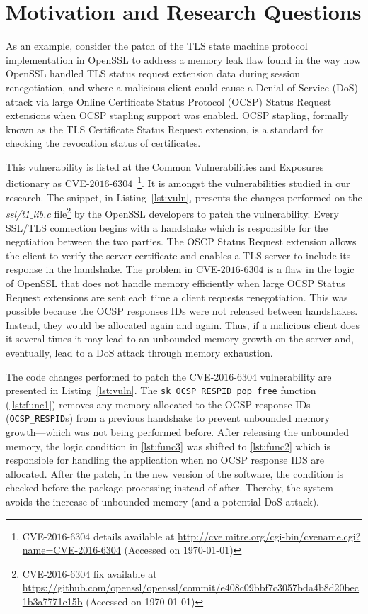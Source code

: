 \documentclass[smallextended]{svjour3}       %
\makeatletter
\newcommand\footnoteref[1]{\protected@xdef\@thefnmark{\ref{#1}}\@footnotemark}
\makeatother
\begin{document}
\section{Motivation and Research Questions}\label{sec:motivation}

As an example, consider the patch of the TLS state machine protocol 
implementation in OpenSSL\footnoteref{openssl} to address a memory 
leak flaw found in the way how OpenSSL handled TLS status request 
extension data during session renegotiation, and where a malicious 
client could cause a Denial-of-Service (DoS) attack via large Online 
Certificate Status Protocol (OCSP) Status Request extensions when 
OCSP stapling support was enabled. OCSP stapling, formally known 
as the TLS Certificate Status Request extension, is a standard for 
checking the revocation status of certificates. 

This vulnerability is listed at the Common Vulnerabilities and 
Exposures dictionary as CVE-$2016$-$6304$~\footnote{CVE-$2016$-$6304$
details available at 
\url{http://cve.mitre.org/cgi-bin/cvename.cgi?name=CVE-2016-6304}
(Accessed on \today{})}. It is amongst the vulnerabilities studied 
in our research. The snippet, in Listing~\ref{lst:vuln}, presents 
the changes performed on the
\emph{ssl/t1$\_$lib.c} file\footnote{CVE-$2016$-$6304$ fix available 
 at
\url{https://github.com/openssl/openssl/commit/e408c09bbf7c3057bda4b8d20bec1b3a7771c15b}
(Accessed on \today{})} by the OpenSSL developers to patch the 
vulnerability. Every SSL/TLS connection begins with a handshake 
which is responsible for the negotiation between the two parties. 
The OSCP Status Request extension allows the client to verify the 
server certificate and enables a TLS server to include its response 
in the handshake. The problem in CVE-$2016$-$6304$ is a flaw in the 
logic of OpenSSL that does not handle memory efficiently when large 
OCSP Status Request extensions are sent each time a client requests 
renegotiation. This was possible because the OCSP responses IDs 
were not released between handshakes. Instead, they would be 
allocated again and again. Thus, if a malicious client does it 
several times it may lead to an unbounded memory growth on the 
server and, eventually, lead to a DoS attack through memory 
exhaustion. 

The code changes performed to patch the CVE-$2016$-$6304$ vulnerability are 
presented in Listing~\ref{lst:vuln}. The \texttt{sk\_OCSP\_RESPID\_pop\_free} function 
(\ref{lst:func1}) removes any memory allocated to the OCSP response IDs 
(\texttt{OCSP\_RESPID}s) from a previous handshake to prevent unbounded 
memory growth---which was not being performed before.
After releasing the unbounded memory, the logic condition in 
\ref{lst:func3} was shifted to \ref{lst:func2} which is responsible 
for handling the application when no OCSP response IDS are 
allocated. After the patch, in the new version of the software, the 
condition is checked before the package processing 
instead of after. Thereby, the system avoids the increase of 
unbounded memory (and a potential DoS attack).
\end{document}
